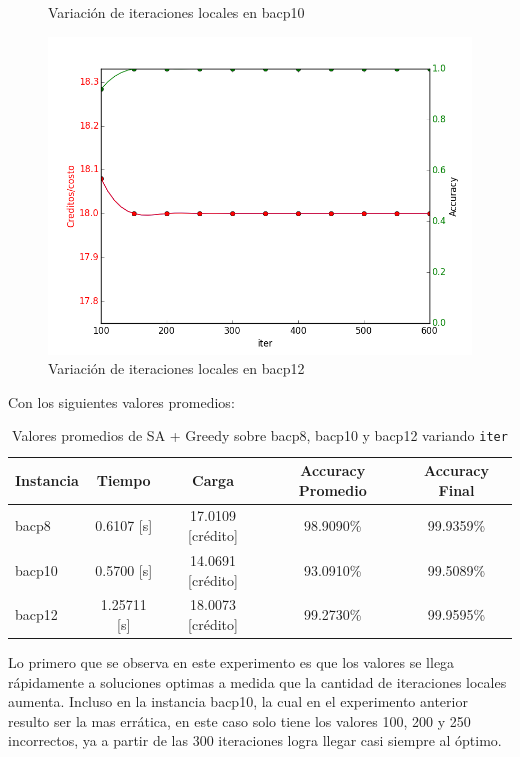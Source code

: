 \documentclass[letterpaper,10pt]{article}
\begin{document}
\begin{figure}[H]
        \caption{Variación de iteraciones locales en bacp10}
        \label{fig:iter2}
    \endminipage\hfill
    \includegraphics[width=\linewidth]{img/2-iter-bacp12.png}
        \caption{Variación de iteraciones locales en bacp12}
        \label{fig:iter3}
    \endminipage
\end{figure}

Con los siguientes valores promedios:

\begin{table}[H]
  \centering
  \begin{tabular}{@{}lcccc@{}}
    \toprule[1pt]
    Instancia & Tiempo & Carga & Accuracy Promedio & Accuracy Final \\
    \midrule
     bacp8 &  0.6107 [s] & 17.0109 [crédito] &  98.9090\% & 99.9359\% \\
    bacp10 &  0.5700 [s] & 14.0691 [crédito] &  93.0910\% & 99.5089\% \\
    bacp12 & 1.25711 [s] & 18.0073 [crédito] &  99.2730\% & 99.9595\% \\
    \bottomrule
  \end{tabular}
  \caption{Valores promedios de SA + Greedy sobre bacp8, bacp10 y bacp12 variando \texttt{iter}}
\end{table}

Lo primero que se observa en este experimento es que los valores se llega rápidamente a soluciones optimas a medida que la cantidad de iteraciones locales aumenta. Incluso en la instancia bacp10, la cual en el experimento anterior resulto ser la mas errática, en este caso solo tiene los valores 100, 200 y 250 incorrectos, ya a partir de las 300 iteraciones logra llegar casi siempre al óptimo.
\end{document}
